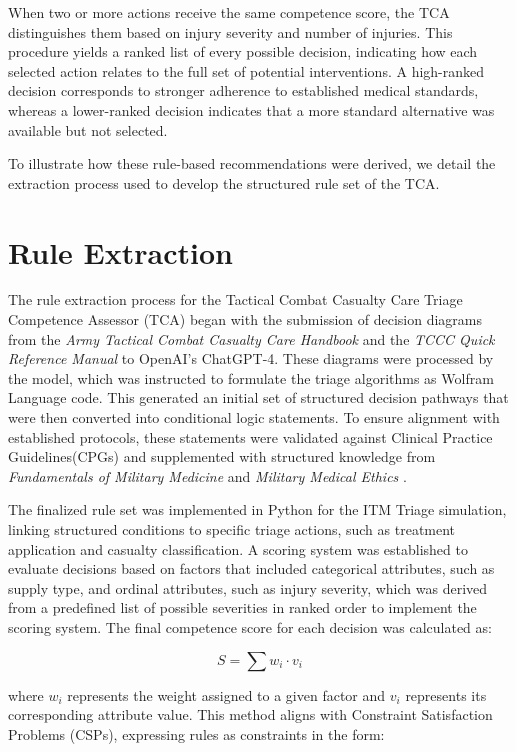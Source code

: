 \documentclass[conference]{IEEEtran}
\begin{document}
When two or more actions receive the same competence score, the TCA distinguishes them based on injury severity and number of injuries. This procedure yields a ranked list of every possible decision, indicating how each selected action relates to the full set of potential interventions. A high-ranked decision corresponds to stronger adherence to established medical standards, whereas a lower-ranked decision indicates that a more standard alternative was available but not selected.

To illustrate how these rule-based recommendations were derived, we detail the extraction process used to develop the structured rule set of the TCA.

\section{Rule Extraction}
\label{sec:rule_extraction}
The rule extraction process for the Tactical Combat Casualty Care Triage Competence Assessor (TCA) began with the submission of decision diagrams from the \textit{Army Tactical Combat Casualty Care Handbook} \cite{army2017tccc} and the \textit{TCCC Quick Reference Manual} \cite{cotccc2021tccc} to OpenAI’s ChatGPT-4. These diagrams were processed by the model, which was instructed to formulate the triage algorithms as Wolfram Language code. This generated an initial set of structured decision pathways that were then converted into conditional logic statements. To ensure alignment with established protocols, these statements were validated against Clinical Practice Guidelines(CPGs) \cite{jts2025cpgs} and supplemented with structured knowledge from \textit{Fundamentals of Military Medicine} \cite{oconnor2019fundamentals} and \textit{Military Medical Ethics} \cite{beam2003military}.

The finalized rule set was implemented in Python for the ITM Triage simulation, linking structured conditions to specific triage actions, such as treatment application and casualty classification. A scoring system was established to evaluate decisions based on factors that included categorical attributes, such as supply type, and ordinal attributes, such as injury severity, which was derived from a predefined list of possible severities in ranked order to implement the scoring system. The final competence score for each decision was calculated as:

\[
S = \sum w_i \cdot v_i
\]

where \( w_i \) represents the weight assigned to a given factor and \( v_i \) represents its corresponding attribute value. This method aligns with Constraint Satisfaction Problems (CSPs), expressing rules as constraints in the form:
\end{document}
